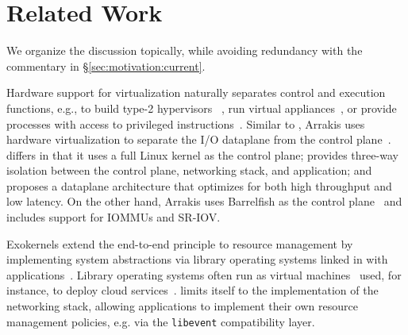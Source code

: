 

\section{Related Work}
\label{sec:related}

We organize the discussion topically, while avoiding redundancy with
the commentary in \S\ref{sec:motivation:current}.

 Hardware support for
virtualization naturally separates control and execution functions,
e.g., to build type-2 hypervisors
~\cite{DBLP:journals/tocs/BugnionDRSW12,misc/kivity07kvm}, run virtual
appliances~\cite{DBLP:conf/lisa/SapuntzakisBCZCLR03}, or provide processes
with access to privileged instructions~\cite{dune}. Similar to \ix,
Arrakis uses hardware virtualization to separate the I/O dataplane
from the control plane~\cite{arrakis-osdi}. \ix differs in that it
uses a full Linux kernel as the control plane; provides three-way
isolation between the control plane, networking stack, and
application; and proposes a dataplane architecture that optimizes for
both high throughput and low latency. On the other hand, Arrakis uses
Barrelfish as the control
plane~\cite{DBLP:conf/sosp/BaumannBDHIPRSS09} and includes support for
IOMMUs and SR-IOV.

 Exokernels extend the
end-to-end principle to resource management by implementing system
abstractions via library operating systems linked in with
applications~\cite{DBLP:conf/sosp/EnglerKO95}.  Library operating
systems often run as virtual machines~\cite{DBLP:journals/tocs/BugnionDGR97} used, for instance, to deploy
cloud services~\cite{DBLP:conf/asplos/MadhavapeddyMRSSGSHC13}. \ix
limits itself to the implementation of the networking stack, allowing
applications to implement their own resource management policies,
e.g. via the \texttt{libevent} compatibility layer.

